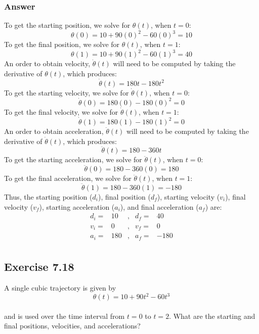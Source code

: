 \documentclass[10pt]{article}
\begin{document}
\subsubsection*{Answer}
To get the starting position, we solve for \(\theta(t)\), when \(t = 0\):
\[\theta(0) = 10 + 90(0)^2 - 60(0)^3 = 10\]
To get the final position, we solve for \(\theta(t)\), when \(t = 1\):
\[\theta(1) = 10 + 90(1)^2 - 60(1)^3 = 40\]
An order to obtain velocity, \(\dot{\theta}(t)\) will need to be computed by taking the derivative of \(\theta(t)\), which produces:
\[\dot{\theta}(t) = 180t - 180t^2\]
To get the starting velocity, we solve for \(\dot{\theta}(t)\), when \(t = 0\):
\[\dot{\theta}(0) = 180(0) - 180(0)^2 = 0\]
To get the final velocity, we solve for \(\dot{\theta}(t)\), when \(t = 1\):
\[\dot{\theta}(1) = 180(1) - 180(1)^2 = 0\]
An order to obtain acceleration, \(\ddot{\theta}(t)\) will need to be computed by taking the derivative of \(\dot{\theta}(t)\), which produces:
\[\ddot{\theta}(t) = 180 - 360t\]
To get the starting acceleration, we solve for \(\ddot{\theta}(t)\), when \(t = 0\):
\[\ddot{\theta}(0) = 180 - 360(0) = 180\]
To get the final acceleration, we solve for \(\ddot{\theta}(t)\), when \(t = 1\):
\[\ddot{\theta}(1) = 180 - 360(1) = -180\]
Thus, the starting position (\(d_i\)), final position (\(d_f\)), starting velocity (\(v_i\)), final velocity (\(v_f\)), starting acceleration (\(a_i\)), and final acceleration (\(a_f\)) are:
\[
\begin{array}{lrllr}
    d_i = &10 &,& d_f = &40  \\
    v_i = &0  &,& v_f = &0   \\
    a_i = &180 &,& a_f = &-180 \\
\end{array}
\]
\pagebreak
\subsection*{Exercise 7.18}
A single cubic trajectory is given by \\
\[
\theta(t) = 10 + 90t^2 - 60t^3
\]
\\
and is used over the time interval from \(t = 0\) to \(t = 2\). What are the starting and final positions, velocities, and accelerations?
\end{document}
